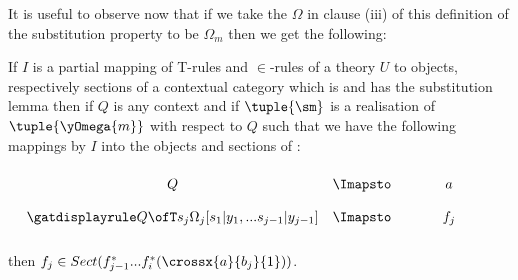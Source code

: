 It is useful to observe now that if we take the  $\Omega$ in clause (iii) of this definition of the substitution property 
to be $\Omega_m$ then we get the following:
\begin{observation}
\newcommand {\forceSOURCEwidth}{\rule{5cm}{0pt}}  %
\newcommand {\forceTARGETwidth}{\rule{2.2cm}{0pt}}
If $I$ is a partial mapping of T-rules and $\in$-rules of a theory $U$ to objects, respectively sections of a contextual category \catcw
which is  and has the substitution lemma then if $Q$ is any context and if $\tuple{\sm}$ is a realisation of $\tuple{\yOmega{m}}$ with respect to $Q$
such that we have the following mappings by $I$ into the objects and sections of \catc:
\begin{equation*}
\begin{array}{c c c}
\forceSOURCEwidth & & \forceTARGETwidth \\ [-0.1cm]
Q          & \Imapsto & a   \\ [0.4cm]
\sjrule    & \Imapsto & f_j \\ [0.4cm]
\end{array}
\end{equation*}
then $f_j \in Sect(f_{j-1}^*...f_i^*(\crossx{a}{b_j}{1}))$.
\end{observation}

